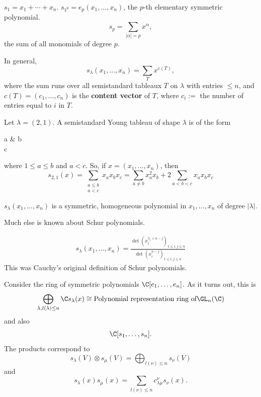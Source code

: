 \begin{ex}
    $s_1=x_1+\cdots +x_n$. $s_{1^p}=e_p(x_1,\dots,x_n)$, the $p$-th elementary symmetric polynomial.
    $$s_p=\sum_{|\alpha|=p}x^\alpha,$$
    the sum of all monomials of degree $p$.
\end{ex}

\begin{thm}
    In general,
    $$s_\lambda (x_1,\dots,x_n)=\sum_{T} x^{c(T)},$$
    where the sum runs over all semistandard tableaux $T$ on $\lambda$ with entries $\leq n$, and $c(T)=(c_1,\dots,c_n)$ is the \textbf{content vector} of $T$, where $c_i:=$ the number of entries equal to $i$ in $T$.
\end{thm}

\begin{ex}
    Let $\lambda = (2,1)$. A semistandard Young tableau of shape $\lambda$ is of the form
    \begin{ytableau}
        a & b \\ c
    \end{ytableau}
    where $1 \leq a \leq b$ and $a < c$. So, if $x=(x_1,\dots,x_n)$, then
    $$s_{2,1}(x) =\sum_{\substack{a\leq b \\ a<c}}x_ax_bx_c=\sum_{a \neq b}x_a^2x_b + 2\sum_{a<b<c}x_ax_bx_c$$
\end{ex}

\begin{rmk}
    $s_\lambda(x_1,\dots,x_n)$ is a symmetric, homogeneous polynomial in $x_1,\dots,x_n$ of degree $|\lambda|$.
\end{rmk}

Much else is known about Schur polynomials.

\begin{prop}
    \begin{align*}
        s_\lambda(x_1,\dots,x_n) = \frac{\det (x_i^{\lambda _i +n -j})_{1 \leq i,j \leq n}}{\det (x_i^{n-j})_{1 \leq i,j \leq n}}
    \end{align*}
    This was Cauchy's original definition of Schur polynomials.
\end{prop}

Consider the ring of symmetric polynomials $\C[e_1,\dots,e_n]$. As it turns out, this is
$$\bigoplus_{\lambda, l(\lambda)\leq n}\C s_\lambda (x) \cong \text{Polynomial representation ring of} \GL_n(\C)$$
and also
$$\C[s_1,\dots,s_n].$$
The products correspond to
$$s_\lambda (V) \otimes s_\mu(V) = \bigoplus_{l(\nu) \leq n}s_\nu (V)$$
and
$$s_\lambda (x) s_\mu(x)=\sum _{l(\nu)\leq n}c_{\lambda \mu}^\nu s_\nu (x).$$

